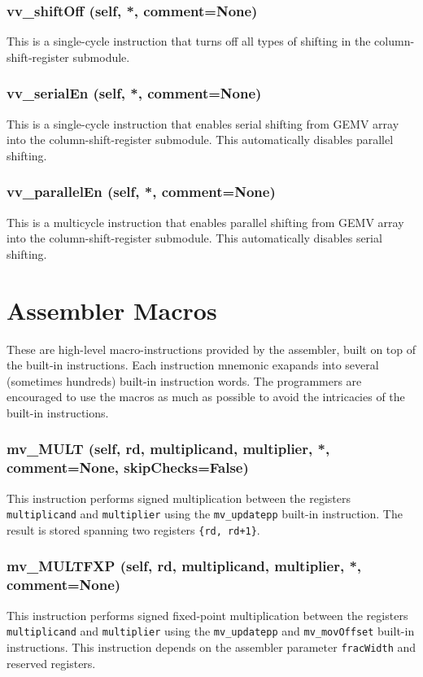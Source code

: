 \documentclass{article}
\begin{document}
\subsubsection*{vv\_shiftOff (self, *, comment=None)}
This is a single-cycle instruction that turns off all types of shifting in the
column-shift-register submodule.


\subsubsection*{vv\_serialEn (self, *, comment=None)}
This is a single-cycle instruction that enables serial shifting from GEMV array into the
column-shift-register submodule.
This automatically disables parallel shifting.


\subsubsection*{vv\_parallelEn (self, *, comment=None)}
This is a multicycle instruction that enables parallel shifting from GEMV array into the
column-shift-register submodule.
This automatically disables serial shifting.




\section{Assembler Macros}
These are high-level macro-instructions provided by the assembler, built on top
of the built-in instructions.
Each instruction mnemonic exapands into several (sometimes hundreds) built-in
instruction words.
The programmers are encouraged to use the macros as much as possible to avoid
the intricacies of the built-in instructions.


\subsubsection*{mv\_MULT (self, rd, multiplicand, multiplier, *, comment=None, skipChecks=False)}
This instruction performs signed multiplication between the registers \texttt{multiplicand} and
\texttt{multiplier} using the \texttt{mv\_updatepp} built-in instruction.
The result is stored spanning two registers \texttt{\{rd, rd+1\}}.


\subsubsection*{mv\_MULTFXP (self, rd, multiplicand, multiplier, *, comment=None)}
This instruction performs signed fixed-point multiplication between the
registers \texttt{multiplicand} and \texttt{multiplier} using the
\texttt{mv\_updatepp} and \texttt{mv\_movOffset} built-in instructions.
This instruction depends on the assembler parameter \texttt{fracWidth} and
reserved registers.
\end{document}
